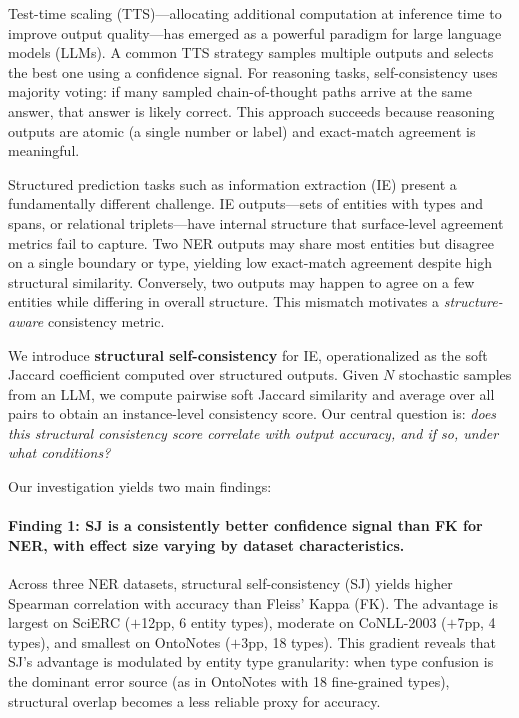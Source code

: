 \documentclass[11pt]{article}
\begin{document}
Test-time scaling (TTS)---allocating additional computation at inference time to improve output quality---has emerged as a powerful paradigm for large language models (LLMs).
A common TTS strategy samples multiple outputs and selects the best one using a confidence signal.
For reasoning tasks, self-consistency \citep{wang2023selfconsistency} uses majority voting: if many sampled chain-of-thought paths arrive at the same answer, that answer is likely correct.
This approach succeeds because reasoning outputs are atomic (a single number or label) and exact-match agreement is meaningful.

Structured prediction tasks such as information extraction (IE) present a fundamentally different challenge.
IE outputs---sets of entities with types and spans, or relational triplets---have internal structure that surface-level agreement metrics fail to capture.
Two NER outputs may share most entities but disagree on a single boundary or type, yielding low exact-match agreement despite high structural similarity.
Conversely, two outputs may happen to agree on a few entities while differing in overall structure.
This mismatch motivates a \emph{structure-aware} consistency metric.

We introduce \textbf{structural self-consistency} for IE, operationalized as the soft Jaccard coefficient computed over structured outputs.
Given $N$ stochastic samples from an LLM, we compute pairwise soft Jaccard similarity and average over all pairs to obtain an instance-level consistency score.
Our central question is: \emph{does this structural consistency score correlate with output accuracy, and if so, under what conditions?}

Our investigation yields two main findings:

\paragraph{Finding 1: SJ is a consistently better confidence signal than FK for NER, with effect size varying by dataset characteristics.}
Across three NER datasets, structural self-consistency (SJ) yields higher Spearman correlation with accuracy than Fleiss' Kappa (FK).
The advantage is largest on SciERC ($+$12pp, 6 entity types), moderate on CoNLL-2003 ($+$7pp, 4 types), and smallest on OntoNotes ($+$3pp, 18 types).
This gradient reveals that SJ's advantage is modulated by entity type granularity: when type confusion is the dominant error source (as in OntoNotes with 18 fine-grained types), structural overlap becomes a less reliable proxy for accuracy.
\end{document}
